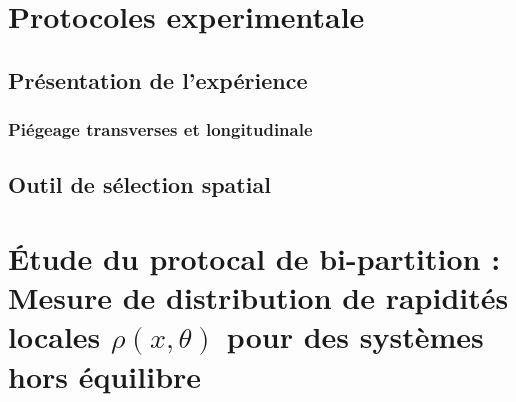 
\chapter{Protocoles experimentale}
\minitoc
\section{Présentation de l’expérience}

\subsection{Piégeage transverses et longitudinale}
\section{Outil de sélection spatial}


\chapter{Étude du protocal de bi-partition : Mesure de distribution de rapidités locales $\rho(x , \theta ) $  pour des systèmes hors équilibre}
\minitoc



